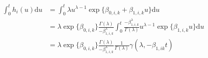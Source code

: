 \begin{align}
  \int_{0}^{t} h_{i}(u)\text{d}u &=
    \int_{0}^{t} 
      \lambda u ^{\lambda - 1} 
      \exp\{
        \beta_{0, i, k} + \beta_{1, i, k} u
      \} 
    \text{d}u \\
  &=
    \lambda
    \exp\{\beta_{0, i, k}\}
    \frac{\Gamma(\lambda)}{-\beta_{1, i, k}^{\lambda}}
    \int_{0}^{t}
      \frac{-\beta_{1, i, k}^{\lambda}}{\Gamma(\lambda)}
      u^{\lambda - 1}
      \exp\{\beta_{1, i, k} u\}
    \text{d}u \\
  &= 
    \lambda
    \exp\{\beta_{0, i, k}\}
    \frac{\Gamma(\lambda)}{-\beta_{1, i, k}^{\lambda}}
    \frac{1}{\Gamma(\lambda)}
    \gamma(\lambda, -\beta_{1, i k}t)
  \label{eqn:submodel-two-hazard-integral}
\end{align}